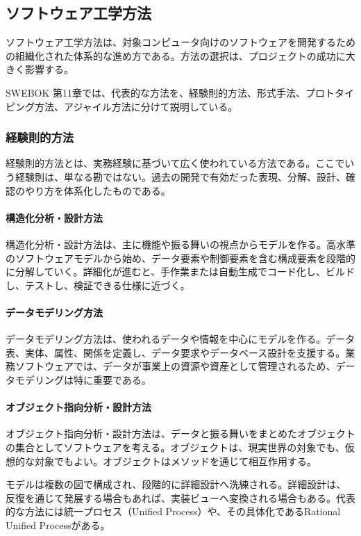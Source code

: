 \subsection{ソフトウェア工学方法}
ソフトウェア工学方法は、対象コンピュータ向けのソフトウェアを開発するための組織化された体系的な進め方である。方法の選択は、プロジェクトの成功に大きく影響する。

SWEBOK 第11章では、代表的な方法を、経験則的方法、形式手法、プロトタイピング方法、アジャイル方法に分けて説明している。

\subsubsection{経験則的方法}
経験則的方法とは、実務経験に基づいて広く使われている方法である。ここでいう経験則は、単なる勘ではない。過去の開発で有効だった表現、分解、設計、確認のやり方を体系化したものである。

\paragraph{構造化分析・設計方法}
構造化分析・設計方法は、主に機能や振る舞いの視点からモデルを作る。高水準のソフトウェアモデルから始め、データ要素や制御要素を含む構成要素を段階的に分解していく。詳細化が進むと、手作業または自動生成でコード化し、ビルドし、テストし、検証できる仕様に近づく。

\paragraph{データモデリング方法}
データモデリング方法は、使われるデータや情報を中心にモデルを作る。データ表、実体、属性、関係を定義し、データ要求やデータベース設計を支援する。業務ソフトウェアでは、データが事業上の資源や資産として管理されるため、データモデリングは特に重要である。

\paragraph{オブジェクト指向分析・設計方法}
オブジェクト指向分析・設計方法は、データと振る舞いをまとめたオブジェクトの集合としてソフトウェアを考える。オブジェクトは、現実世界の対象でも、仮想的な対象でもよい。オブジェクトはメソッドを通じて相互作用する。

モデルは複数の図で構成され、段階的に詳細設計へ洗練される。詳細設計は、反復を通じて発展する場合もあれば、実装ビューへ変換される場合もある。代表的な方法には統一プロセス（Unified Process）や、その具体化であるRational Unified Processがある。

